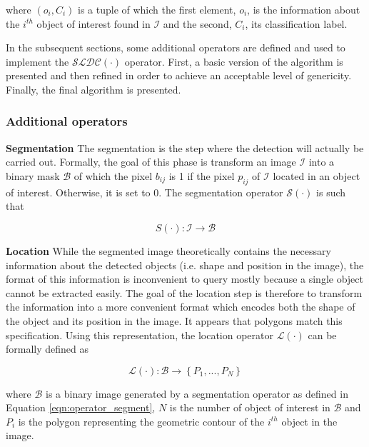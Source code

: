 where $(o_i, C_i)$ is a tuple of which the first element, $o_i$, is the information about the $i^{th}$ object of interest found in $\mathcal{I}$ and the second, $C_i$, its classification label. 

In the subsequent sections, some additional operators are defined and used to implement the $\mathcal{SLDC}(\cdot)$ operator. First, a basic version of the algorithm is presented and then refined in order to achieve an acceptable level of genericity. Finally, the final algorithm is presented. 

\subsubsection{Additional operators}
\label{sssec:other_operators}

\begin{definition} \textbf{Segmentation} The segmentation is the step where the detection will actually be carried out. Formally, the goal of this phase is transform an image $\mathcal{I}$ into a binary mask $\mathcal{B}$ of which the pixel $b_{ij}$ is 1 if the pixel $p_{ij}$ of $\mathcal{I}$ located in an object of interest. Otherwise, it is set to 0. The segmentation operator $\mathcal{S}(\cdot)$ is such that

\begin{equation}
	\label{eqn:operator_segment}
	S(\cdot) : \mathcal{I} \rightarrow \mathcal{B}
\end{equation}
\end{definition}

\begin{definition} \textbf{Location} While the segmented image theoretically contains the necessary information about the detected objects (i.e. shape and position in the image), the format of this information is inconvenient to query mostly because a single object cannot be extracted easily. The goal of the location step is therefore to transform the information into a more convenient format which encodes both the shape of the object and its position in the image. It appears that polygons match this specification. Using this representation, the location operator $\mathcal{L}(\cdot)$ can be formally defined as 

\begin{equation}
	\mathcal{L}(\cdot) : \mathcal{B} \rightarrow \left\{P_1, ..., P_N\right\}
\end{equation}

where $\mathcal{B}$ is a binary image generated by a segmentation operator as defined in Equation \ref{eqn:operator_segment}, $N$ is the number of object of interest in $\mathcal{B}$ and $P_i$ is the polygon representing the geometric contour of the $i^{th}$ object in the image.
\end{definition}

